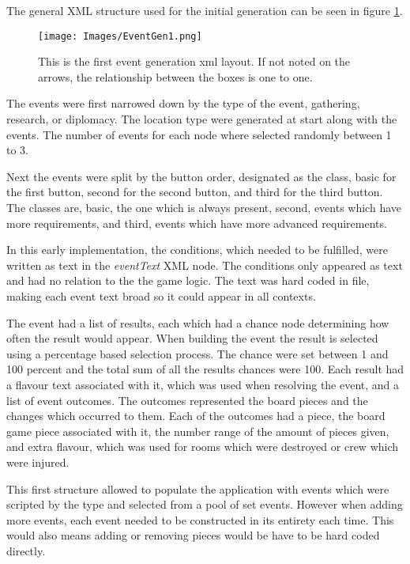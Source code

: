 The general XML structure used for the initial generation can be seen in figure \ref{fig:eGen1}.

\begin{figure}[h]
    \centering
    \texttt{[image: Images/EventGen1.png]}
    \caption{This is the first event generation xml layout. If not noted on the arrows, the relationship between the boxes is one to one.}
    \label{fig:eGen1}
\end{figure}

The events were first narrowed down by the type of the event, gathering, research, or diplomacy. The location type were generated at start along with the events. The number of events for each node where selected randomly between 1 to 3.

Next the events were split by the button order, designated as the class, basic for the first button, second for the second button, and third for the third button. 
The classes are, basic, the one which is always present, second, events which have more requirements, and third, events which have more advanced requirements. 


In this early implementation, the conditions, which needed to be fulfilled, were written as text in the \textit{eventText} XML node. The conditions only appeared as text and had no relation to the the game logic. The text was hard coded in file, making each event text broad so it could appear in all contexts.

The event had a list of results, each which had a chance node determining how often the result would appear. When building the event the result is selected using a percentage based selection process. The chance were set between 1 and 100 percent and the total sum of all the results chances were 100. 
Each result had a flavour text associated with it, which was used when resolving the event, and a list of event outcomes. 
The outcomes represented the board pieces and the changes which occurred to them. Each of the outcomes had a piece, the board game piece associated with it, the number range of the amount of pieces given, and extra flavour, which was used for rooms which were destroyed or crew which were injured.

This first structure allowed to populate the application with events which were scripted by the type and selected from a pool of set events. 
However when adding more events, each event needed to be constructed in its entirety each time. This would also means adding or removing pieces would be have to be hard coded directly. 

